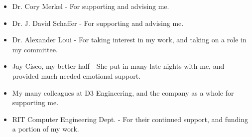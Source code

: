 %
%
%


\frontmatter


\begin{acknowledgments}
\begin{itemize}
    \item Dr. Cory Merkel - For supporting and advising me.
    \item Dr. J. David Schaffer - For supporting and advising me.
    \item Dr. Alexander Loui - For taking interest in my work, and taking on a role in my committee.
    \item Jay Cisco, my better half - She put in many late nights with me, and provided much needed emotional support.
    \item My many colleagues at D3 Engineering, and the company as a whole for supporting me.
    \item RIT Computer Engineering Dept. - For their continued support, and funding a portion of my work.
\end{itemize}
\end{acknowledgments} 




